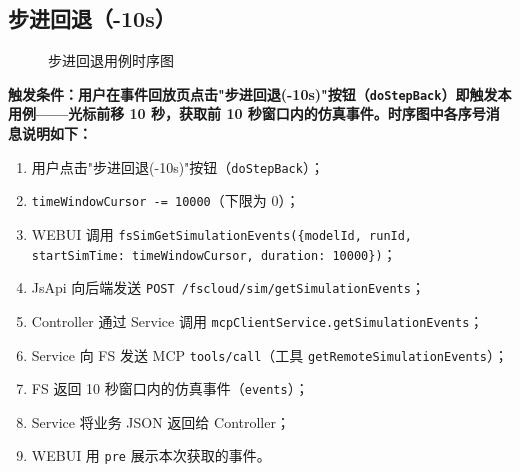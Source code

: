 \subsection{步进回退（-10s）}
\begin{figure}[!h]
	\centering
	\resizebox{1.0\linewidth}{!}{}
	\caption{步进回退用例时序图}\label{fig:stepBack}
\end{figure}
\bf{触发条件}：用户在事件回放页点击"步进回退(-10s)"按钮（\texttt{doStepBack}）即触发本用例——光标前移 10 秒，获取前 10 秒窗口内的仿真事件。时序图中各序号消息说明如下：
\begin{enumerate}[label=\arabic*)]
	\item 用户点击"步进回退(-10s)"按钮（\texttt{doStepBack}）；
	\item \texttt{timeWindowCursor -= 10000}（下限为 0）；
	\item WEBUI 调用 \texttt{fsSimGetSimulationEvents(\{modelId, runId, startSimTime: timeWindowCursor, duration: 10000\})}；
	\item JsApi 向后端发送 \texttt{POST /fscloud/sim/getSimulationEvents}；
	\item Controller 通过 Service 调用 \texttt{mcpClientService.getSimulationEvents}；
	\item Service 向 FS 发送 MCP \texttt{tools/call}（工具 \texttt{getRemoteSimulationEvents}）；
	\item FS 返回 10 秒窗口内的仿真事件（\texttt{events}）；
	\item Service 将业务 JSON 返回给 Controller；
	\item WEBUI 用 \texttt{pre} 展示本次获取的事件。
\end{enumerate}
\newpage
